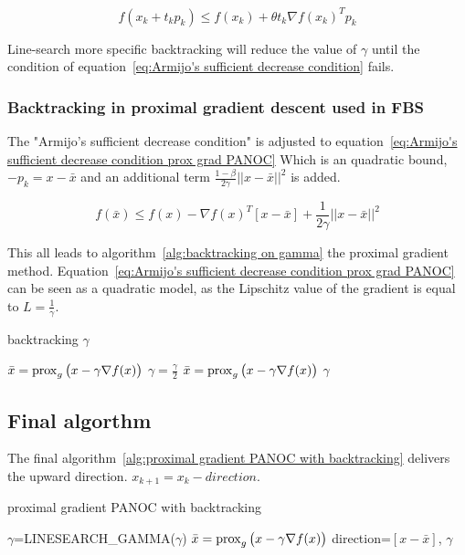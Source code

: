 			\begin{equation}
			f(x_k + t_kp_k) \leq f(x_k) + \theta t_k \nabla f(x_k)^Tp_k
			\label{eq:Armijo's sufficient decrease condition}
			\end{equation}
			
			Line-search more specific backtracking will reduce the value of $\gamma$ until the condition of equation~\ref{eq:Armijo's sufficient decrease condition} fails.
			
		\subsubsection{Backtracking in proximal gradient descent used in FBS}
			The  "Armijo's sufficient decrease condition" is adjusted to equation~\ref{eq:Armijo's sufficient decrease condition prox grad PANOC} Which is an quadratic bound, $-p_k=x-\bar{x}$ and an additional term $\frac{1-\beta}{2 \gamma}||x-\bar{x}||^2$ is added.
			
			\begin{equation}
			f({\bar{x}}) \leq f(x) - \nabla f(x)^T[x-\bar{x}] + \frac{1}{2 \gamma}||x-\bar{x}||^2
			\label{eq:Armijo's sufficient decrease condition prox grad PANOC}
			\end{equation}
			
			This all leads to algorithm~\ref{alg:backtracking on gamma} the proximal gradient method. Equation~\ref{eq:Armijo's sufficient decrease condition prox grad PANOC} can be seen as a quadratic model, as the Lipschitz value of the gradient is equal to $L=\frac{1}{\gamma}$.
			
			\begin{algorithm}
				\caption{backtracking $\gamma$}
				\label{alg:backtracking on gamma}
				\begin{algorithmic}[1]
					\State $\bar{x} = \operatorname{prox}_{g}\big( x- \gamma \nabla f(x)\big)$
					\State $\gamma = \frac{\gamma}{2}$
					\State $\bar{x} = \operatorname{prox}_{g}\big( x- \gamma \nabla f(x)\big)$
					\EndWhile
					\State \Return $\gamma$
					\EndProcedure
				\end{algorithmic}
			\end{algorithm}
	\subsection{Final algorthm}
		The final algorithm~\ref{alg:proximal gradient PANOC with backtracking} delivers the upward direction. $x_{k+1}=x_k - direction$.
		\begin{algorithm}
			\caption{proximal gradient PANOC with backtracking}
			\label{alg:proximal gradient PANOC with backtracking}
			\begin{algorithmic}[1]
				\Procedure{get\_proximal\_gradient\_step}{x,$\gamma$}
				\State $\gamma$=LINESEARCH\_GAMMA($\gamma$)
				\State $\bar{x} = \operatorname{prox}_{g}\big( x- \gamma \nabla f(x)\big)$
				\State \Return direction=$[x-\bar{x}]$, $\gamma$
				\EndProcedure
			\end{algorithmic}
		\end{algorithm}
